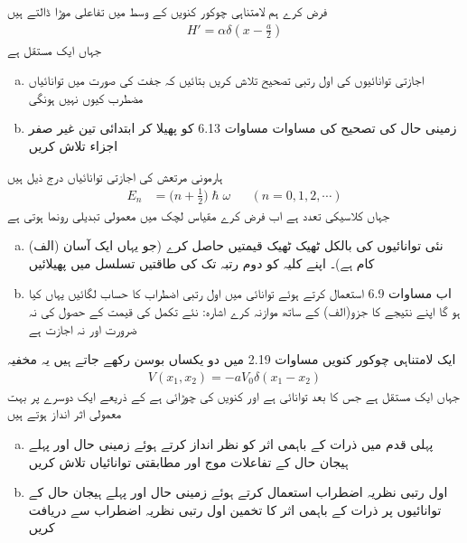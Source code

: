 فرض کرے ہم لامتناہی چوکور کنویں کے وسط میں  تفاعلی موڑا ڈالتے ہیں 
\begin{align*}
H' = \alpha \delta (x - \frac{a}{2})
\end{align*}
جہاں  ایک مستقل ہے 
\begin{enumerate}[a.]
\item
 اجازتی توانائیوں کی اول رتبی تصحیح تلاش کریں بتائیں کہ جفت  کی صورت میں توانائیاں مضطرب کیوں نہیں ہونگی   
\item
 زمینی حال کی  تصحیح  کی مساوات مساوات 6.13 کو پھیلا کر  ابتدائی تین غیر صفر اجزاء تلاش کریں  
 \end{enumerate}

ہارمونی مرتعش  
کی اجازتی توانائیاں درج ذیل ہیں 
\begin{align*}
E_n &= \big(n + \frac{1}{2}\big) \hslash \omega  && (n = 0, 1, 2, \cdots )
\end{align*}
جہاں  کلاسیکی تعدد ہے اب فرض کرے مقیاس لچک میں معمولی تبدیلی رونما ہوتی ہے 
\begin{enumerate}[a.]
\item
(الف) نئی  توانائیوں کی بالکل ٹھیک ٹھیک قیمتیں  حاصل  کرے (جو یہاں ایک آسان کام ہے)۔ اپنے  کلیہ کو دوم رتبہ تک  کی طاقتیں تسلسل میں پھیلائیں 
\item
 اب مساوات 6.9 استعمال کرتے ہوئے توانائی میں اول رتبی اضطراب کا حساب لگائیں یہاں  کیا  ہو گا اپنے نتیجے کا جزو(الف) کے ساتھ موازنہ کرے اشارہ: نئے تکمل کی قیمت کے حصول کی نہ ضرورت اور نہ اجازت ہے 
 \end{enumerate}
ایک لامتناہی چوکور کنویں مساوات 2.19 میں دو یکساں بوسن رکھے جاتے ہیں یہ مخفیہ 
\begin{align*}
V(x_1, x_2) = -aV_0\delta (x_1 - x_2)
\end{align*}
 جہاں  ایک مستقل ہے جس کا بعد توانائی ہے  اور  کنویں کی چوڑائی ہے کے ذریعے ایک دوسرے پر بہت معمولی اثر انداز ہوتے ہیں 
\begin{enumerate}[a.]
\item
 پہلی قدم میں ذرات کے باہمی   اثر  کو نظر انداز کرتے ہوئے زمینی حال اور پہلے ہیجان حال کے تفاعلات موج اور مطابقتی توانائیاں تلاش کریں 
\item
 اول رتبی نظریہ اضطراب استعمال کرتے ہوئے زمینی حال اور پہلے    ہیجان  حال کے توانائیوں پر ذرات کے باہمی  اثر کا تخمین اول رتبی نظریہ اضطراب سے دریافت کریں 
 \end{enumerate}

